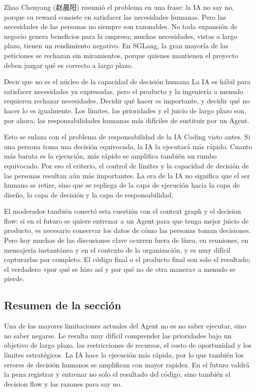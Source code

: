 \documentclass[a4paper]{article}
\begin{document}
Zhao Chenyang (赵晨阳) resumió el problema en una frase: la IA no say no, porque su reward consiste en satisfacer las necesidades humanas. Pero las necesidades de las personas no siempre son razonables. No toda expansión de negocio genera beneficios para la empresa; muchas necesidades, vistas a largo plazo, tienen un rendimiento negativo. En SGLang, la gran mayoría de las peticiones se rechazan sin miramientos, porque quienes mantienen el proyecto deben juzgar qué es correcto a largo plazo.

\begin{importantbox}{Decir que no es el núcleo de la capacidad de decisión humana}
La IA es hábil para satisfacer necesidades ya expresadas, pero el producto y la ingeniería a menudo requieren rechazar necesidades. Decidir qué hacer es importante, y decidir qué no hacer lo es igualmente. Los límites, las prioridades y el juicio de largo plazo son, por ahora, las responsabilidades humanas más difíciles de sustituir por un Agent.
\end{importantbox}

Esto se enlaza con el problema de responsabilidad de la IA Coding visto antes. Si una persona toma una decisión equivocada, la IA la ejecutará más rápido. Cuanto más barata es la ejecución, más rápido se amplifica también un rumbo equivocado. Por eso el criterio, el control de límites y la capacidad de decisión de las personas resultan aún más importantes. La era de la IA no significa que el ser humano se retire, sino que se repliega de la capa de ejecución hacia la capa de diseño, la capa de decisión y la capa de responsabilidad.

El moderador también conectó esta cuestión con el context graph y el decision flow: si en el futuro se quiere entrenar a un Agent para que tenga mejor juicio de producto, es necesario conservar los datos de cómo las personas toman decisiones. Pero hoy muchas de las discusiones clave ocurren fuera de línea, en reuniones, en mensajería instantánea y en el contexto de la organización, y es muy difícil capturarlas por completo. El código final o el producto final son solo el resultado; el verdadero «por qué se hizo así y por qué no de otra manera» a menudo se pierde.

\subsection{Resumen de la sección}

Una de las mayores limitaciones actuales del Agent no es no saber ejecutar, sino no saber negarse. Le resulta muy difícil comprender las prioridades bajo un objetivo de largo plazo, las restricciones de recursos, el costo de oportunidad y los límites estratégicos. La IA hace la ejecución más rápida, por lo que también los errores de decisión humanos se amplifican con mayor rapidez. En el futuro valdrá la pena registrar y entrenar no solo el resultado del código, sino también el decision flow y las razones para say no.
\end{document}
